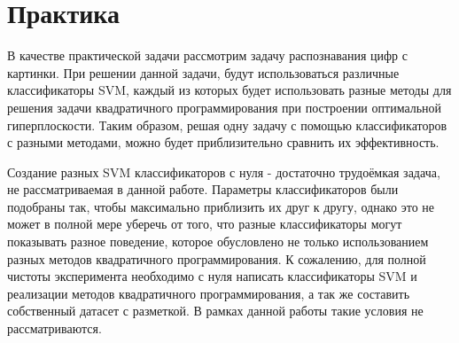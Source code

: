 \documentclass[12pt,a4paper]{article}
\begin{document}
\section{Практика}
В качестве практической задачи рассмотрим задачу распознавания цифр с картинки. При решении данной задачи, будут использоваться различные классификаторы SVM, каждый из которых будет использовать разные методы для решения задачи квадратичного программирования при построении оптимальной гиперплоскости. Таким образом, решая одну задачу с помощью классификаторов с разными методами, можно будет приблизительно сравнить их эффективность. 

Создание разных SVM классификаторов с нуля - достаточно трудоёмкая задача, не рассматриваемая в данной работе. Параметры классификаторов были подобраны так, чтобы максимально приблизить их друг к другу, однако это не может в полной мере уберечь от того, что разные классификаторы могут показывать разное поведение, которое обусловлено не только использованием разных методов квадратичного программирования. К сожалению,  для полной чистоты эксперимента необходимо с нуля написать классификаторы SVM и реализации методов квадратичного программирования, а так же составить собственный датасет с разметкой. В рамках данной работы такие условия не рассматриваются.
\end{document}
